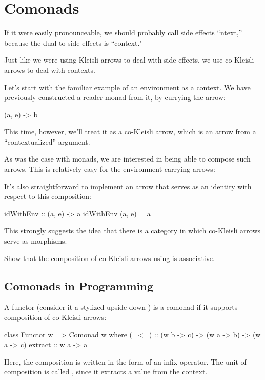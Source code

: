 \documentclass[DaoFP]{subfiles}
\begin{document}
\setcounter{chapter}{16}

\chapter{Comonads}

If it were easily pronounceable, we should probably call side effects ``ntext,'' because the dual to side effects is ``context."

Just like we were using Kleisli arrows to deal with side effects, we use co-Kleisli arrows to deal with contexts. 

Let's start with the familiar example of an environment as a context. We have previously constructed a reader monad from it, by currying the arrow:
\begin{haskell}
(a, e) -> b
\end{haskell}
This time, however, we'll treat it as a co-Kleisli arrow, which is an arrow from a ``contextualized'' argument.

As was the case with monads, we are interested in being able to compose such arrows. This is relatively easy for the environment-carrying arrows:

It's also straightforward to implement an arrow that serves as an identity with respect to this composition:

\begin{haskell}
idWithEnv :: (a, e) -> a
idWithEnv (a, e) = a
\end{haskell}

This strongly suggests the idea that there is a category in which co-Kleisli arrows serve as morphisms. 

\begin{exercise}
Show that the composition of co-Kleisli arrows using  is associative.
\end{exercise}

\section{Comonads in Programming}

A functor  (consider it a stylized upside-down ) is a comonad if it supports composition of co-Kleisli arrows:

\begin{haskell}
class Functor w => Comonad w where
   (=<=) :: (w b -> c) -> (w a -> b) -> (w a -> c)
   extract :: w a -> a
\end{haskell}
Here, the composition is written in the form of an infix operator. The unit of composition is called , since it extracts a value from the context. 
\end{document}

